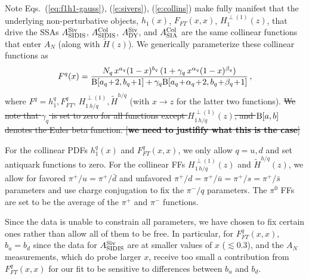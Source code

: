 \documentclass[twocolumn,prl,aps,superscriptaddress
               ,footinbib,amsfonts,amsmath,amssymb,showpacs]{revtex4-1}
\newcommand{\com}[1]{{\color{red} [\textbf{#1}]}}
\newcommand{\old}[1]{{\color{red}\sout{#1}}}
\begin{document}
Note Eqs.~(\ref{eq:f1h1-gauss}), (\ref{e:sivers}), (\ref{e:collins})
make fully manifest that the underlying non-perturbative objects, 
    $h_1(x)$, 
    $F_{FT}(x,x)$, 
    $H_1^{\perp(1)}(z)$, 
that drive the SSAs 
    $A_{\rm SIDIS}^{\rm Siv}$, 
    $A_{\rm SIDIS}^{\rm Col}$, 
    $A_{\rm DY}^{\rm Siv}$, 
    and $A_{\rm SIA}^{\rm Col}$ 
are the same collinear functions that enter $A_N$ (along with
$\tilde{H}(z)$).  
%
We generically parameterize these collinear functions as
%
\begin{equation}
F^q(x)=\frac{N_q\,x^{a_q}(1-x)^{b_q}\,(1+\gamma_q\,x^{\alpha_q}(1-x)^{\beta_q})}
            {{\rm B}[a_q\!+\!2,b_q\!+\!1]
             +\gamma_q {\rm B}[a_q\!
             +\!\alpha_q\!+\!2,b_q\!
             +\!\beta_q\!+\!1]}   
\,, 
\label{e:colfunc}
\end{equation}
%
where $F^q=h_1^q,F_{FT}^q$, $H_{1 \,h/q}^{\perp (1)}, \tilde{H}^{h/q}$
(with $x\to z$ for the latter two functions).
%
\old{We note that $\gamma_q$ is set to zero for all functions except
$H_{1\, h/q}^{\perp (1)}(z)$, and ${\rm B}[a,b]$ denotes the Euler
beta function. \com{we need to justifify what this is the case}}

For the collinear PDFs $h_1^q(x)$ and $F_{FT}^q(x,x)$, we only allow
$q=u,d$ and set antiquark functions to zero.
%
For the collinear FFs $H_{1 \,h/q}^{\perp (1)}(z)$ and $\tilde{H}^{h/q}(z)$, 
we allow for favored $\pi^+/u=\pi^+/\bar{d}$ and unfavored
$\pi^+/d=\pi^+/\bar{u}=\pi^+/s=\pi^+/\bar{s}$ parameters and use
charge conjugation to fix the $\pi^-/q$ parameters.  
%
The $\pi^0$ FFs are set to be the average of the $\pi^+$ and $\pi^-$
functions.  

Since the data is unable to constrain all parameters, we have chosen
to fix certain ones rather than allow all of them to be free.
%
In particular, for $F_{FT}^q(x,x)$, $b_u=b_d$ since the data for
$A_{\rm SIDIS}^{\rm Siv}$ are at smaller values of $x$ ($\lesssim
0.3$), and the $A_N$ measurements, which do probe larger $x$, receive
too small a contribution from $F_{FT}^q(x,x)$ for our fit to be
sensitive to differences between $b_u$ and $b_d$. 
\end{document}
